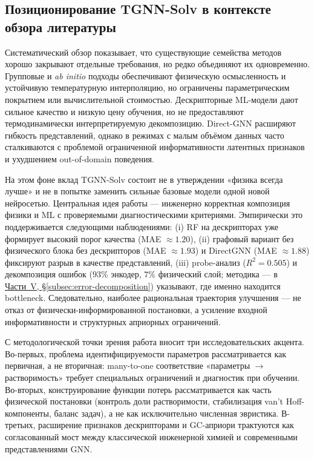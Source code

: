 \documentclass[11pt]{article}
\begin{document}
\subsection{Позиционирование TGNN-Solv в контексте обзора литературы}

Систематический обзор показывает, что существующие семейства методов хорошо закрывают отдельные требования, но редко объединяют их одновременно. Групповые и \textit{ab initio} подходы обеспечивают физическую осмысленность и устойчивую температурную интерполяцию, но ограничены параметрическим покрытием или вычислительной стоимостью. Дескрипторные ML-модели дают сильное качество и низкую цену обучения, но не предоставляют термодинамически интерпретируемую декомпозицию. Direct-GNN расширяют гибкость представлений, однако в режимах с малым объёмом данных часто сталкиваются с проблемой ограниченной информативности латентных признаков и ухудшением out-of-domain поведения.

На этом фоне вклад TGNN-Solv состоит не в утверждении «физика всегда лучше» и не в попытке заменить сильные базовые модели одной новой нейросетью. Центральная идея работы --- инженерно корректная композиция физики и ML с проверяемыми диагностическими критериями. Эмпирически это поддерживается следующими наблюдениями: (i) RF на дескрипторах уже формирует высокий порог качества (MAE $\approx 1.20$), (ii) графовый вариант без физического блока без дескрипторов (MAE $\approx 1.93$) и DirectGNN (MAE $\approx 1.88$) фиксируют разрыв в качестве представлений, (iii) probe-анализ ($R^2=0.505$) и декомпозиция ошибок ($93\%$ энкодер, $7\%$ физический слой; методика --- в \hyperref[subsec:error-decomposition]{Части~V, §\ref*{subsec:error-decomposition}}) указывают, где именно находится bottleneck. Следовательно, наиболее рациональная траектория улучшения --- не отказ от физически-информированной постановки, а усиление входной информативности и структурных априорных ограничений.

С методологической точки зрения работа вносит три исследовательских акцента. Во-первых, проблема идентифицируемости параметров рассматривается как первичная, а не вторичная: many-to-one соответствие «параметры $\rightarrow$ растворимость» требует специальных ограничений и диагностик при обучении. Во-вторых, конструирование функции потерь рассматривается как часть физической постановки (контроль доли растворимости, стабилизация van't Hoff-компоненты, баланс задач), а не как исключительно численная эвристика. В-третьих, расширение признаков дескрипторами и GC-априори трактуются как согласованный мост между классической инженерной химией и современными представлениями GNN.
\end{document}
